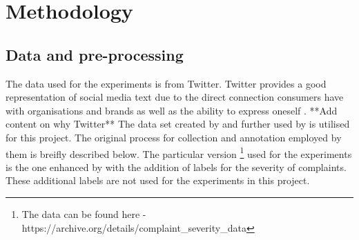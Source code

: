 \chapter{Methodology}

\section{Data and pre-processing}
The data used for the experiments is from Twitter. Twitter provides a good representation of social media text due to the direct connection consumers have with organisations and brands as well as the ability to express oneself \cite{preotiuc-pietro_automatically_2019}. **Add content on why Twitter**
\newline \newline
The data set created by \cite{preotiuc-pietro_automatically_2019} and further used by \cite{jin_complaint_2020} is utilised for this project. The original process for collection and annotation employed by them is breifly described below. The particular version \footnote{The data can be found here - https://archive.org/details/complaint\_severity\_data} used for the experiments is the one enhanced by \cite{jinModelingSeverityComplaints2021} with the addition of labels for the severity of complaints. These additional labels are not used for the experiments in this project.
